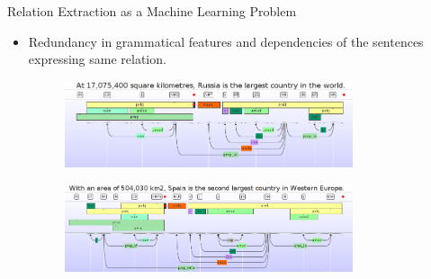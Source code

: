\documentclass{beamer}
\begin{document}
\begin{frame}{Relation Extraction as a Machine Learning Problem}
 
 \begin{itemize}
  \item Redundancy in grammatical features and dependencies of the sentences expressing same relation. \pause 
     \begin{figure}
    \centering
    \includegraphics[width = 0.8\textwidth]{images/ex_4}
  \end{figure} \pause
  
   \begin{figure}
    \centering
    \includegraphics[width = 0.8\textwidth]{images/ex_5}
  \end{figure}
 \end{itemize}

\end{frame}
\end{document}

